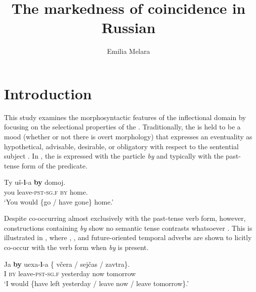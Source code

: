 \documentclass[output=paper,modfonts,newtxmath,hidelinks,]{langscibook}
\title{The markedness of coincidence in Russian}
\author{Emilia Melara\affiliation{University of Toronto}}
\begin{document}
\maketitle
{}



\section{Introduction}\label{10:s1}


This study examines the morphosyntactic features of the  inflectional domain by focusing on the selectional properties of the  . Traditionally, the  is held to be a mood (whether or not there is overt morphology) that expresses an eventuality as hypothetical, advisable, desirable, or obligatory with respect to the sentential subject  \citep[142]{HarrisonLeFleming2000}. In , the  is expressed with the particle \textit{by} and typically with the past-tense form of the predicate.

\ea \label{10:ex1}
\gll Ty uš-\textbf{l}{}-a \textbf{by} domoj.\\
     you leave\textsc{-pst-sg.f} \textsc{by} home.\\
\glt `You would \{go / have gone\} home.' \hfill \citep[152]{Mezhevich2006}
\z

\noindent Despite co-occurring almost exclusively with the past-tense verb form, however, constructions containing \textit{by} show no semantic tense contrasts whatsoever \citep[298]{Spencer2001}. This is illustrated in , where , , and future-oriented temporal adverbs are shown to licitly co-occur with the  verb form when \textit{by} is present. 

\ea \label{10:ex2}
\gll Ja \textbf{by} uexa-\textbf{l}{}-a \{\hspace{-2pt} včera / sejčas / zavtra\}.\\
     I \textsc{by} leave\textsc{-pst-sg.f} {} yesterday {} now {} tomorrow\\
\glt `I would \{have left yesterday / leave now / leave tomorrow\}.'\\
\hfill \citep[136]{Mezhevich2006}
\z
\end{document}
